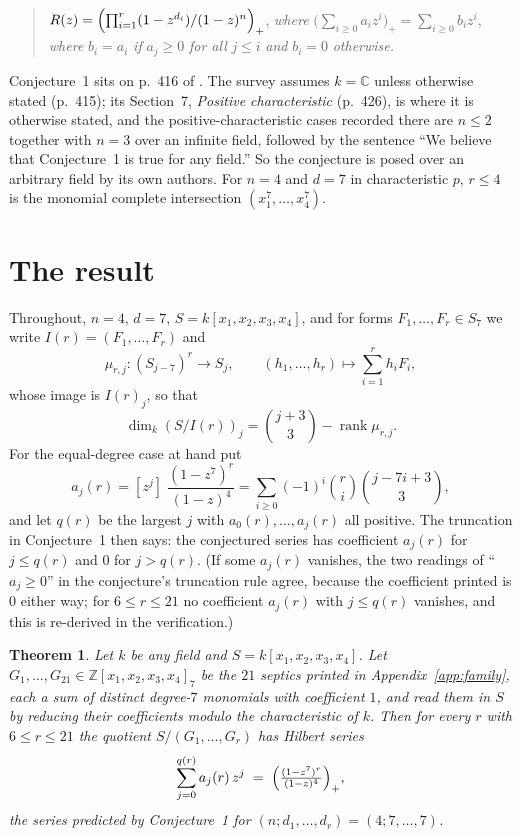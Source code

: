 \documentclass[11pt]{amsart}
\newtheorem{theorem}{Theorem}
\theoremstyle{remark}
\DeclareMathOperator{\rank}{rank}
\newcommand{\ZZ}{\mathbb Z}
\begin{document}
\begin{quote}
$R(z)=\Bigl(\prod_{i=1}^{r}(1-z^{d_i})/(1-z)^n\Bigr)_+$, \emph{where}
$\bigl(\sum_{i\ge0}a_iz^i\bigr)_+=\sum_{i\ge0}b_iz^i$, \emph{where} $b_i=a_i$
\emph{if} $a_j\ge0$ \emph{for all} $j\le i$ \emph{and} $b_i=0$
\emph{otherwise.}
\end{quote}

\noindent
Conjecture~1 sits on p.~416 of \cite{FL}. The survey assumes $k=\mathbb C$
unless otherwise stated (p.~415); its Section~7, \emph{Positive characteristic}
(p.~426), is where it is otherwise stated, and the positive-characteristic cases
recorded there are $n\le2$ together with $n=3$ over an infinite field, followed
by the sentence ``We believe that Conjecture~1 is true for any field.'' So the
conjecture is posed over an arbitrary field by its own authors. For $n=4$ and
$d=7$ in characteristic $p$, $r\le4$ is the monomial complete intersection
$(x_1^7,\dots,x_4^7)$.

\section{The result}

Throughout, $n=4$, $d=7$, $S=k[x_1,x_2,x_3,x_4]$, and for forms
$F_1,\dots,F_r\in S_7$ we write $I(r)=(F_1,\dots,F_r)$ and
\[
  \mu_{r,j}\colon (S_{j-7})^{r}\longrightarrow S_j,
  \qquad (h_1,\dots,h_r)\longmapsto \sum_{i=1}^{r}h_iF_i ,
\]
whose image is $I(r)_j$, so that
\begin{equation}\label{eq:hf}
  \dim_k (S/I(r))_j=\binom{j+3}{3}-\rank \mu_{r,j}.
\end{equation}
For the equal-degree case at hand put
\[
  a_j(r)=[z^j]\;\frac{(1-z^{7})^{r}}{(1-z)^{4}}
        =\sum_{i\ge0}(-1)^i\binom{r}{i}\binom{j-7i+3}{3},
\]
and let $q(r)$ be the largest $j$ with $a_0(r),\dots,a_j(r)$ all positive. The
truncation in Conjecture~1 then says: the conjectured series has coefficient
$a_j(r)$ for $j\le q(r)$ and $0$ for $j>q(r)$. (If some $a_j(r)$ vanishes, the
two readings of ``$a_j\ge0$'' in the conjecture's truncation rule agree, because
the coefficient printed is $0$ either way; for $6\le r\le21$ no coefficient
$a_j(r)$ with $j\le q(r)$ vanishes, and this is re-derived in the verification.)

\begin{theorem}\label{thm:main}
Let $k$ be \emph{any} field and $S=k[x_1,x_2,x_3,x_4]$. Let
$G_1,\dots,G_{21}\in\ZZ[x_1,x_2,x_3,x_4]_7$ be the $21$ septics printed in
Appendix~\ref{app:family}, each a sum of distinct degree-$7$ monomials with
coefficient $1$, and read them in $S$ by reducing their coefficients modulo the
characteristic of $k$. Then for every $r$ with $6\le r\le 21$ the quotient
$S/(G_1,\dots,G_r)$ has Hilbert series
\[
  \sum_{j=0}^{q(r)}a_j(r)\,z^{j}
  \;=\;\Bigl(\tfrac{(1-z^{7})^{r}}{(1-z)^{4}}\Bigr)_+ ,
\]
the series predicted by Conjecture~1 for $(n;d_1,\dots,d_r)=(4;7,\dots,7)$.
\end{theorem}
\end{document}
